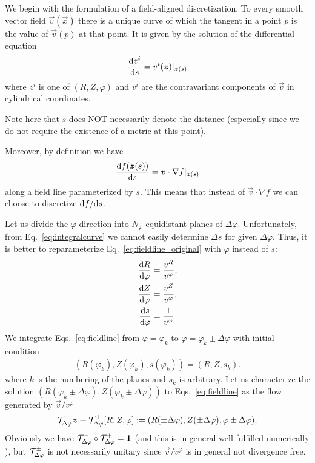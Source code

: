 We begin with the formulation of a field-aligned discretization.
To every smooth vector field $\vec v(\vec x)$ there is a unique curve of which the
tangent in a point $p$ is the value of $\vec v(p)$ at that point. It is given by
the solution of the differential equation
\begin{align}
  \frac{\mathrm{d} z^i}{\mathrm{d} s} = v^i({\boldsymbol{z}})|_{{\boldsymbol{z}}(s)}
    \label{eq:integralcurve}
\end{align}
where $z^i$ is one of $(R, Z, \varphi)$ and $v^i$ are the contravariant components
of $\vec v$ in cylindrical coordinates.
\begin{tcolorbox}[title=Note]
Note here that $s$ does NOT necessarily denote the distance
(especially since we do not require the existence of a metric at this point).
\end{tcolorbox}
Moreover, by definition we have
\begin{align}
    \frac{\mathrm{d} f({\boldsymbol{z}}(s))}{\mathrm{d} s} = {\boldsymbol{v}}\cdot \nabla f|_{{\boldsymbol{z}}(s)}
    \label{eq:fieldline_original}
\end{align}
along a field line parameterized by $s$.
This means that instead of $\vec v \cdot \nabla f$ we can choose to discretize ${\mathrm{d} f}/{\mathrm{d} s}$.

Let us divide the $\varphi$ direction into $N_\varphi$ equidistant planes of
$\Delta \varphi$. Unfortunately, from Eq.~\eqref{eq:integralcurve} we cannot easily determine
$\Delta s$ for given $\Delta \varphi$.
Thus, it is better to reparameterize Eq.~\eqref{eq:fieldline_original} with $\varphi$ instead of $s$:
\begin{subequations}
\begin{align}
    \frac{\d R}{\d\varphi}&= \frac{v^R}{v^\varphi},\\ %
    \frac{\d Z}{\d\varphi}&=\frac{v^Z}{v^\varphi},\\%
    \frac{\d s}{\d\varphi}&=\frac{1}{v^\varphi}
\end{align}
\label{eq:fieldline}
\end{subequations}
We integrate Eqs.~\eqref{eq:fieldline} from $\varphi=\varphi_k$ to $\varphi=\varphi_k\pm \Delta \varphi$
with initial condition
\begin{align}
    (R(\varphi_k), Z(\varphi_k), s(\varphi_k) ) = (R, Z, s_k).
    \label{}
\end{align}
where $k$ is the numbering of the planes and $s_k$ is arbitrary.
Let us characterize the solution $(R(\varphi_k\pm \Delta \varphi), Z(\varphi_k\pm \Delta \varphi))$ to Eqs.~\eqref{eq:fieldline} as the flow generated by $\vec v/v^\varphi$
\begin{align}
    \mathcal T^\pm_{\Delta\varphi}{\boldsymbol{z}} \equiv \mathcal T^\pm_{\Delta\varphi}[R, Z, \varphi]:= ( R(\pm \Delta\varphi), Z( \pm \Delta\varphi), \varphi\pm\Delta \varphi),
    \label{}
\end{align}
Obviously we have $\mathcal T^-_{\Delta\varphi}\circ\mathcal T^+_{\Delta\varphi} = \mathbf{1}$ (and this is in general well fulfilled
numerically ), but $\mathcal T^\pm_{\Delta\varphi}$ is not necessarily unitary since $\vec v/v^\varphi$ is in general
not divergence free.

